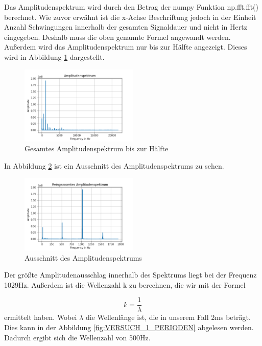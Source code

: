 \documentclass[12pt, oneside, a4paper, \docLanguage]{report}
\begin{document}
Das Amplitudenspektrum wird durch den Betrag der numpy Funktion np.fft.fft() berechnet. Wie zuvor erwähnt ist die x-Achse Beschriftung jedoch in der Einheit Anzahl Schwingungen innerhalb der gesamten Signaldauer und nicht in Hertz eingegeben. Deshalb muss die oben genannte Formel angewandt werden. Außerdem wird das Amplitudenspektrum nur bis zur Hälfte angezeigt. Dieses wird in Abbildung \ref{fig:VERSUCH_1_ASB} dargestellt.

\begin{figure}[H]
	\centering\small
	\includegraphics[width=0.5\textwidth]{media/AmplitudenspektrumBreit.png}
	\caption{Gesamtes Amplitudenspektrum bis zur Hälfte}
	\label{fig:VERSUCH_1_ASB}
\end{figure}

In Abbildung \ref{fig:VERSUCH_1_ASS} ist ein Ausschnitt des Amplitudenspektrums zu sehen.

\begin{figure}[H]
	\centering\small
	\includegraphics[width=0.5\textwidth]{media/AmplitudenspektrumSchmal.png}
	\caption{Ausschnitt des Amplitudenspektrums}
	\label{fig:VERSUCH_1_ASS}
\end{figure}

Der größte Amplitudenausschlag innerhalb des Spektrums liegt bei der Frequenz 1029Hz. Außerdem ist die Wellenzahl k zu berechnen, die wir mit der Formel 

\begin{equation*}
	k = \frac{1}{\lambda}
\end{equation*}
ermittelt haben. Wobei $\lambda$ die Wellenlänge ist, die in unserem Fall 2ms beträgt. Dies kann in der Abbildung \ref{fig:VERSUCH_1_PERIODEN} abgelesen werden. Dadurch ergibt sich die Wellenzahl von 500Hz.
\end{document}
